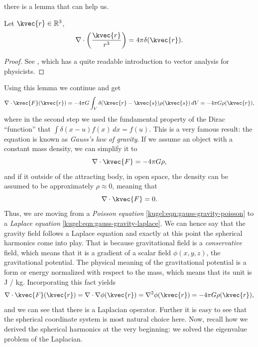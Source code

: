 there is a lemma that can help us.
\begin{lemma}
  Let $\kvec{r} \in \mathbb{R}^3$,
  \label{kugel:thm:div-and-dirac}
  \begin{equation*}
    \nabla \cdot \left(
      \frac{\kvec{r}}{r^3}
    \right) = 4\pi \delta(\kvec{r}).
  \end{equation*}
\end{lemma}
\begin{proof}
  See \cite{griffiths_introduction_2015}, which has a quite readable
  introduction to vector analysis for physicists.
\end{proof}
Using this lemma we continue and get
\begin{equation*}
  \nabla \cdot \kvec{F}(\kvec{r})
    = -4\pi G \int_{V} \delta(\kvec{r}-\kvec{s}) \rho(\kvec{s}) \, dV 
    = -4\pi G \rho(\kvec{r}),
\end{equation*}
where in the second step we used the fundamental property of the Dirac
``function'' that $\int \delta (x - u) f(x) \, dx = f(u)$.  This is a very famous
result: the equation is known as \emph{Gauss's law of gravity}.  If we assume an
object with a constant mass density, we can simplify it to
\begin{equation}
  \label{kugel:eqn:gauss-gravity-poisson}
  \nabla \cdot \kvec{F} = -4\pi G \rho,
\end{equation}
and if it outside of the attracting body, in open space, the density can be
assumed to be approximately $\rho \approx 0$, meaning that
\begin{equation}
  \label{kugel:eqn:gauss-gravity-laplace}
  \nabla \cdot \kvec{F} = 0.
\end{equation}
Thus, we are moving from a \emph{Poisson equation}
\eqref{kugel:eqn:gauss-gravity-poisson} to a \emph{Laplace equation}
\eqref{kugel:eqn:gauss-gravity-laplace}.  We can hence say that the gravity field
follows a Laplace equation and exactly at this point the spherical harmonics
come into play. That is because gravitational field is a \emph{conservative}
field, which means that it is a gradient of a scalar field $\phi(x, y, z)$, the
gravitational potential. The physical meaning of the gravitational potential is
a form or energy normalized with respect to the mass, which means that its unit
is J / kg. Incorporating this fact yields
\begin{equation*}
  \nabla \cdot \kvec{F}(\kvec{r})
  = \nabla \cdot \nabla \phi(\kvec{r})
  = \nabla^2 \phi(\kvec{r})
  = -4\pi G \rho(\kvec{r}),
\end{equation*}
and we can see that there is a Laplacian operator. Further it is easy to see
that the spherical coordinate system is most natural choice here.  Now, recall
how we derived the spherical harmonics at the very beginning: we solved the
eigenvalue problem of the Laplacian.

